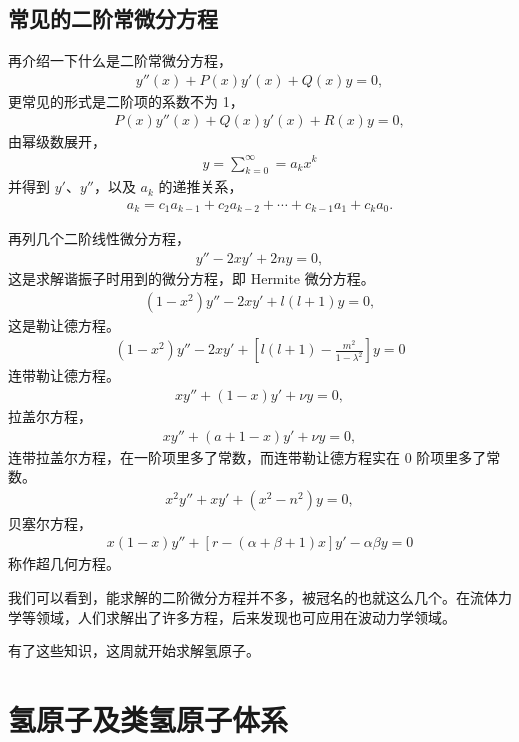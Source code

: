 \section{常见的二阶常微分方程}
再介绍一下什么是二阶常微分方程，
\begin{align}
    y''(x) + P(x) y'(x) + Q(x) y = 0,
\end{align}
更常见的形式是二阶项的系数不为 1，
\begin{align}
    P(x) y''(x) + Q(x) y'(x) + R(x) y = 0,
\end{align}
由幂级数展开，
\begin{align}
    y = \sum_{k=0}^\infty = a_k x^k 
\end{align}
并得到 $y'$、$y''$，以及 $a_k$ 的递推关系，
\begin{align}
    a_k = c_1 a_{k-1} + c_2 a_{k-2} + \cdots + c_{k-1} a_1 + c_k a_0.
\end{align}

再列几个二阶线性微分方程，
\begin{align}
    y'' - 2x y' + 2ny =0,
\end{align}
这是求解谐振子时用到的微分方程，即 Hermite 微分方程。
\begin{align}
    (1-x^2) y'' - 2x y' + l(l+1) y = 0,
\end{align}
这是勒让德方程。
\begin{align}
    (1-x^2) y'' - 2x y' + \left[
        l(l+1) - \frac{m^2}{1-\lambda^2}
    \right] y = 0
\end{align}
连带勒让德方程。
\begin{align}
    x y'' + (1-x) y' + \nu y = 0,
\end{align}
拉盖尔方程，
\begin{align}
    x y'' + (a+1 - x)y' + \nu y = 0,
\end{align}
连带拉盖尔方程，在一阶项里多了常数，而连带勒让德方程实在 0 阶项里多了常数。
\begin{align}
    x^2 y'' + x y' + (x^2 - n^2) y = 0,
\end{align}
贝塞尔方程，
\begin{align}
    x(1-x) y'' + [r - (\alpha + \beta + 1)x] y' - \alpha \beta y =0
\end{align}
称作超几何方程。

我们可以看到，能求解的二阶微分方程并不多，被冠名的也就这么几个。在流体力学等领域，人们求解出了许多方程，后来发现也可应用在波动力学领域。

有了这些知识，这周就开始求解氢原子。

\chapter{氢原子及类氢原子体系}

